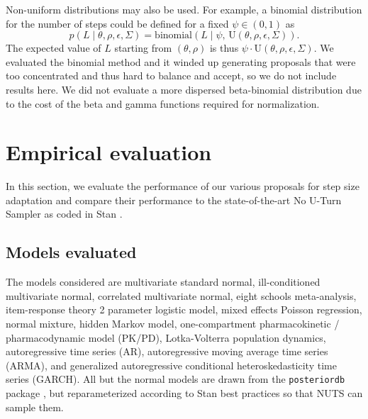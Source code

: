 \documentclass[letterpaper,11pt]{article}
\theoremstyle{plain}%
\theoremstyle{remark}
\begin{document}
Non-uniform distributions may also be used.  For example, a binomial distribution for the number of steps could be defined for a fixed $\psi \in (0, 1)$ as 
\begin{equation}
    p(L \mid \theta, \rho, \epsilon, \Sigma)
    = \textrm{binomial}\!\left(L \mid \psi, \, \textrm{U}(\theta, \rho, \epsilon, \Sigma)\right).
\end{equation}
The expected value of $L$ starting from $(\theta, \rho)$ is thus $\psi \cdot \textrm{U}(\theta, \rho, \epsilon, \Sigma).$  We evaluated the binomial method and it winded up generating proposals that were too concentrated and thus hard to balance and accept, so we do not include results here.  We did not evaluate a more dispersed beta-binomial distribution due to the cost of the beta and gamma functions required for normalization.



\section{Empirical evaluation}\label{sec:experiments}

In this section, we evaluate the performance of our various proposals for step size adaptation and compare their performance to the state-of-the-art No U-Turn Sampler as coded in Stan \cite{HoGe2014,betancourt2017conceptual}.  


\subsection{Models evaluated}

The models considered are multivariate standard normal, ill-conditioned multivariate normal, correlated multivariate normal, eight schools meta-analysis, item-response theory 2 parameter logistic model, mixed effects Poisson regression, normal mixture, hidden Markov model, one-compartment pharmacokinetic / pharmacodynamic model (PK/PD), Lotka-Volterra population dynamics, autoregressive time series (AR), autoregressive moving average time series (ARMA), and generalized autoregressive conditional heteroskedasticity time series (GARCH).  All but the normal models are drawn from the \texttt{posteriordb} package \cite{posteriordb2023}, but reparameterized according to Stan best practices so that NUTS can sample them.
\end{document}
